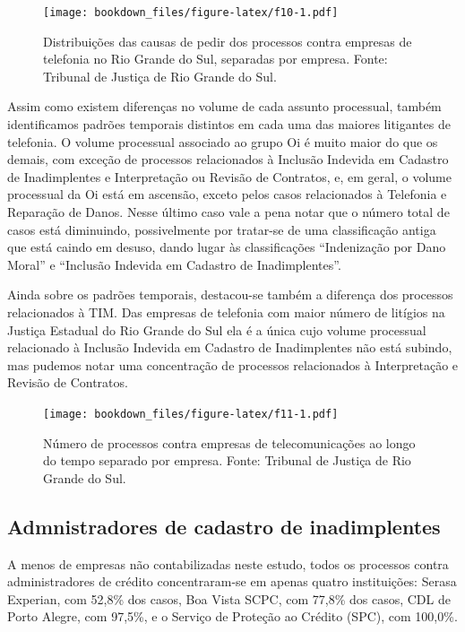 \documentclass[]{report}
\begin{document}
\begin{figure}[htbp]
\centering
\texttt{[image: bookdown\_files/figure-latex/f10-1.pdf]}
\caption{\label{fig:f10}Distribuições das causas de pedir dos processos
contra empresas de telefonia no Rio Grande do Sul, separadas por
empresa. Fonte: Tribunal de Justiça de Rio Grande do Sul.}
\end{figure}

Assim como existem diferenças no volume de cada assunto processual,
também identificamos padrões temporais distintos em cada uma das maiores
litigantes de telefonia. O volume processual associado ao grupo Oi é
muito maior do que os demais, com exceção de processos relacionados à
Inclusão Indevida em Cadastro de Inadimplentes e Interpretação ou
Revisão de Contratos, e, em geral, o volume processual da Oi está em
ascensão, exceto pelos casos relacionados à Telefonia e Reparação de
Danos. Nesse último caso vale a pena notar que o número total de casos
está diminuindo, possivelmente por tratar-se de uma classificação antiga
que está caindo em desuso, dando lugar às classificações ``Indenização
por Dano Moral'' e ``Inclusão Indevida em Cadastro de Inadimplentes''.

Ainda sobre os padrões temporais, destacou-se também a diferença dos
processos relacionados à TIM. Das empresas de telefonia com maior número
de litígios na Justiça Estadual do Rio Grande do Sul ela é a única cujo
volume processual relacionado à Inclusão Indevida em Cadastro de
Inadimplentes não está subindo, mas pudemos notar uma concentração de
processos relacionados à Interpretação e Revisão de Contratos.

\begin{figure}[htbp]
\centering
\texttt{[image: bookdown\_files/figure-latex/f11-1.pdf]}
\caption{\label{fig:f11}Número de processos contra empresas de
telecomunicações ao longo do tempo separado por empresa. Fonte: Tribunal
de Justiça de Rio Grande do Sul.}
\end{figure}

\subsection{Admnistradores de cadastro de
inadimplentes}\label{admnistradores-de-cadastro-de-inadimplentes}

A menos de empresas não contabilizadas neste estudo, todos os processos
contra administradores de crédito concentraram-se em apenas quatro
instituições: Serasa Experian, com 52,8\% dos casos, Boa Vista SCPC, com
77,8\% dos casos, CDL de Porto Alegre, com 97,5\%, e o Serviço de
Proteção ao Crédito (SPC), com 100,0\%.
\end{document}
